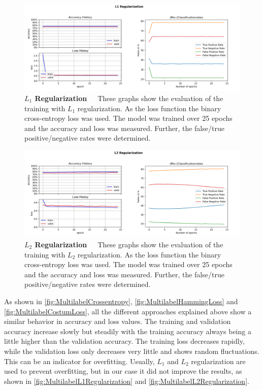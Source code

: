 \begin{figure}[!htb]
    \centering
    \includegraphics[scale=0.37]{Figures/chapter04/multilabel_L1.png}
    \decoRule
    \caption[Multi-Label \(L_1\) Regularization]{\textbf{\(L_1\) Regularization}~~~These graphs show the evaluation of the training with \(L_1\) regularization. As the loss function the binary cross-entropy loss was used. The model was trained over 25 epochs and the accuracy and loss was measured. Further, the false/true positive/negative rates were determined.}
    \label{fig:MultilabelL1Regularization}
\end{figure}

\begin{figure}[!htb]
    \centering
    \includegraphics[scale=0.37]{Figures/chapter04/multilabel_L2.png}
    \decoRule
    \caption[Multi-Label \(L_2\) Regularization]{\textbf{\(L_2\) Regularization}~~~These graphs show the evaluation of the training with \(L_2\) regularization. As the loss function the binary cross-entropy loss was used. The model was trained over 25 epochs and the accuracy and loss was measured. Further, the false/true positive/negative rates were determined.}
    \label{fig:MultilabelL2Regularization}
\end{figure}

As shown in \autoref{fig:MultilabelCrossentropy}, \autoref{fig:MultilabelHammingLoss} and \autoref{fig:MultilabelCostumLoss}, all the different approaches explained above show a similar behavior in accuracy and loss values. The training and validation accuracy increase slowly but steadily with the training accuracy always being a little higher than the validation accuracy. The training loss decreases rapidly, while the validation loss only decreases very little and shows random fluctuations. This can be an indicator for overfitting. Usually, \(L_1\) and \(L_2\) regularization are used to prevent overfitting, but in our case it did not improve the results, as shown in \autoref{fig:MultilabelL1Regularization} and \autoref{fig:MultilabelL2Regularization}.

